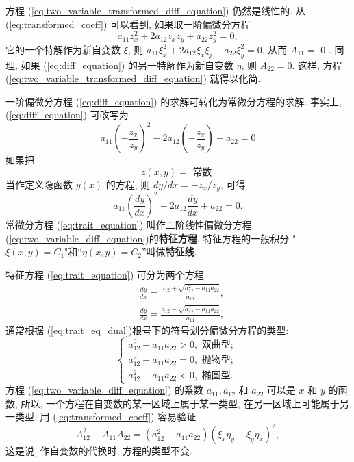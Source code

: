 方程 (\ref{eq:two_variable_transformed_diff_equation}) 仍然是线性的.
从(\ref{eq:transformed_coeff}) 可以看到, 如果取一阶偏微分方程
\begin{equation}
    a_{11} z_x^2+2 a_{12} z_x z_y+a_{22} z_y^2=0, 
    \label{eq:diff_equation}
\end{equation}
它的一个特解作为新自变数 $\xi$, 则 $a_{11} \xi_x^2+2 a_{12} \xi_x \xi_j+a_{22} \xi_y^2=0$, 
从而 $A_{11}=$ 0 . 同理, 如果 (\ref{eq:diff_equation}) 的另一特解作为新自变数 $\eta$, 则 $A_{22}=0$. 
这样, 方程 (\ref{eq:two_variable_transformed_diff_equation}) 就得以化简.

一阶偏微分方程 (\ref{eq:diff_equation}) 的求解可转化为常微分方程的求解. 事实上, (\ref{eq:diff_equation}) 可改写为
\begin{equation}
    a_{11}\left(-\frac{z_x}{z_y}\right)^2-2 a_{12}\left(-\frac{z_x}{z_y}\right)+a_{22}=0
\end{equation}
如果把
$$
z(x, y)=\text { 常数 }
$$
当作定义隐函数 $y(x)$ 的方程, 则 $d y / d x=-z_x / z_y$, 可得
\begin{equation}
    a_{11}\left(\frac{d y}{d x}\right)^2-2 a_{12} 
\frac{d y}{d x}+a_{22}=0 .
\label{eq:trait_equation}
\end{equation}
常微分方程 (\ref{eq:trait_equation}) 叫作二阶线性偏微分方程 (\ref{eq:two_variable_diff_equation})的\textbf{特征方程}, 
特征方程的一般积分 "$\xi(x, y)= C_1 $"和“$\eta(x, y)=C_2$”叫做\textbf{特征线}.

特征方程 (\ref{eq:trait_equation}) 可分为两个方程
\begin{equation}
    \begin{aligned}
        & \frac{d y}{d x}=\frac{a_{12}+\sqrt{a_{12}^2-a_{11} a_{22}}}{a_{11}}, \\
        & \frac{d y}{d x}=\frac{a_{12}-\sqrt{a_{12}^2-a_{11} a_{22}}}{a_{11}},
        \end{aligned}
    \label{eq:trait_eq_dual}
\end{equation}
通常根据 (\ref{eq:trait_eq_dual})根号下的符号划分偏微分方程的类型:
$$
\left\{\begin{array}{l}
a_{12}^2-a_{11} a_{22}>0, \textbf { 双曲型; } \\
a_{12}^2-a_{11} a_{22}=0, \textbf { 抛物型; } \\
a_{12}^2-a_{11} a_{22}<0, \textbf { 椭圆型. }
\end{array}\right.
$$
方程 (\ref{eq:two_variable_diff_equation}) 的系数 $a_{11}, a_{12}$ 和 $a_{22}$ 可以是 $x$ 和 $y$ 的函数,
 所以, 一个方程在自变数的某一区域上属于某一类型, 在另一区域上可能属于另一类型. 用 (\ref{eq:transformed_coeff}) 容易验证
\begin{equation}
    A_{12}^2-A_{11} A_{22}=\left(a_{12}^2-a_{11} a_{22}\right)\left(\xi_x \eta_y-\xi_y \eta_x\right)^2,
\end{equation}
这是说, 作自变数的代换时, 方程的类型不变.


